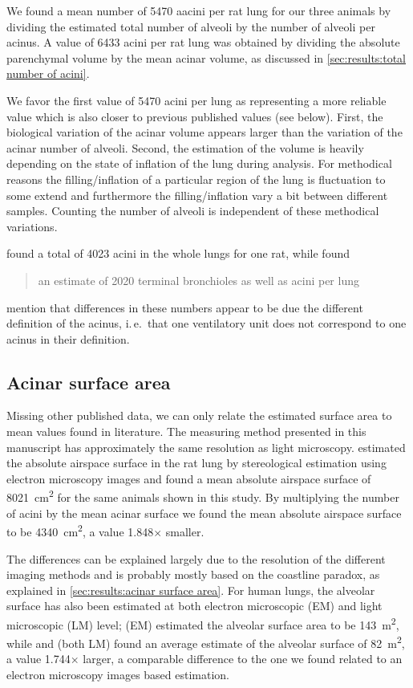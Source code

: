 \documentclass[a4paper,DIV=calc,abstract,english]{scrartcl}
\newcommand{\ie}{i.\,e.\ }
\newcommand{\meantotalnumberofacini}{6433}
\newcommand{\meantotalnumberofaciniVariant}{5470}
\newcommand{\meanairspacesurface}{4340} %
\newcommand{\airspacedifference}{1.848} %
\begin{document}
We found a mean number of \meantotalnumberofaciniVariant\xspace aacini per rat lung for our three animals by dividing the estimated total number of alveoli by the number of alveoli per acinus.
A value of \meantotalnumberofacini\xspace acini per rat lung was obtained by dividing the absolute parenchymal volume by the mean acinar volume, as discussed in \autoref{sec:results:total number of acini}.

We favor the first value of \meantotalnumberofaciniVariant\xspace acini per lung as representing a more reliable value which is also closer to previous published values (see below).
First, the biological variation of the acinar volume appears larger than the variation of the acinar number of alveoli.
Second, the estimation of the volume is heavily depending on the state of inflation of the lung during analysis.
For methodical reasons the filling/inflation of a particular region of the lung is fluctuation to some extend and furthermore the filling/inflation vary a bit between different samples.
Counting the number of alveoli is independent of these methodical variations. 

\citet{Rodriguez1987} found a total of 4023 acini in the whole lungs for one rat, while \citet{Mercer1987a} found \blockquote{an estimate of 2020 terminal bronchioles as well as acini per lung}.
\citeauthor{Mercer1987a} mention that differences in these numbers appear to be due the different definition of the acinus, \ie that one ventilatory unit does not correspond to one acinus in their definition.

\subsection{Acinar surface area}
Missing other published data, we can only relate the estimated surface area to mean values found in literature.
The measuring method presented in this manuscript has approximately the same resolution as light microscopy.
\citet{Tschanz2003} estimated the absolute airspace surface in the rat lung by stereological estimation using electron microscopy images and found a mean absolute airspace surface of \SI{8021}{\centi\meter\squared} for the same animals shown in this study.
By multiplying the number of acini by the mean acinar surface we found the mean absolute airspace surface to be \SI{\meanairspacesurface}{\centi\meter\squared}, a value \airspacedifference\(\times\) smaller.

The differences can be explained largely due to the resolution of the different imaging methods and is probably mostly based on the coastline paradox, as explained in \autoref{sec:results:acinar surface area}.
For human lungs, the alveolar surface has also been estimated at both electron microscopic (EM) and light microscopic (LM) level; \citet{Gehr1978} (EM) estimated the alveolar surface area to be \SI{143}{\square\meter}, while \citet{Weibel1963} and \citet{Thurlbeck1967} (both LM) found an average estimate of the alveolar surface of \SI{82}{\square\meter}, a value 1.744\(\times\) larger, a comparable difference to the one we found related to an electron microscopy images based estimation.
\end{document}

